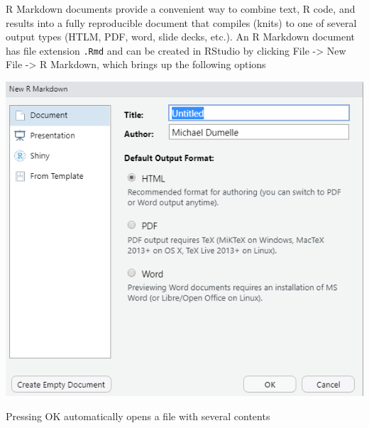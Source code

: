 \documentclass[
]{book}
\begin{document}
R Markdown documents provide a convenient way to combine text, R code, and results into a fully reproducible document that compiles (knits) to one of several output types (HTLM, PDF, word, slide decks, etc.). An R Markdown document has file extension \texttt{.Rmd} and can be created in RStudio by clicking File -\textgreater{} New File -\textgreater{} R Markdown, which brings up the following options

\includegraphics[width=1\linewidth]{images/rmark1}

Pressing OK automatically opens a file with several contents
\end{document}
